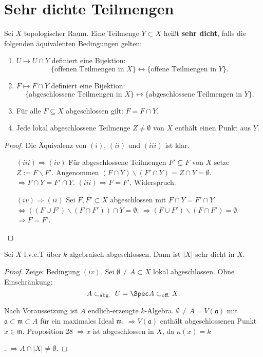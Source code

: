 \section{Sehr dichte Teilmengen}
\begin{defn}[29]
  Sei $X$ topologischer Raum. Eine Teilmenge $Y\subset X$ heißt \textbf{sehr
    dicht}, falls die folgenden äquivalenten Bedingungen gelten:
  \begin{enumerate}
  \item $U\mapsto U\cap Y$ definiert eine Bijektion:
    \[
      \{\text{offenen Teilmengen in }X\}\leftrightarrow\{\text{offene Teilmengen in }Y\}.
    \]
  \item $F\mapsto F\cap Y$ definiert eine Bijektion:
    \[
      \{\text{abgeschlossene Teilmengen in }X\}\leftrightarrow\{\text{abgeschlossene Teilmengen in }Y\}.
    \]
  \item Für alle $F\subseteq X$ abgeschlossen gilt: $F=\overline{F\cap Y}$.
  \item Jede lokal abgeschlossene Teilmenge $Z\neq\emptyset$ von $X$ enthält
    einen Punkt aus $Y$.
  \end{enumerate}
\end{defn}

\begin{proof}
  Die Äquivalenz von $(i)$, $(ii)$ und $(iii)$ ist klar.
  \begin{itemize}
  \item[$(iii)\Rightarrow(iv)$] Für abgeschlossene Teilmengen $F'\subsetneq F$ von $X$ setze $Z:=F\backslash F'$.
    Angenommen $(F\cap Y)\backslash(F'\cap Y)=Z\cap Y=\emptyset$. $\Longrightarrow F\cap Y=F'\cap Y$.
    $(iii)\Longrightarrow F=F'$, Widerspruch.
  \item[$(iv)\Rightarrow(ii)$] Sei $F,F'\subset X$ abgeschlossen mit $F\cap Y=F'\cap Y$. $\Longleftrightarrow((F\cup F')\backslash(F\cap F'))\cap Y=\emptyset$.
    $\Longrightarrow(F\cup F')\backslash(F\cap F')=\emptyset$. $\Longrightarrow F=F'$.
  \end{itemize}
\end{proof}
\begin{prop}[30]
  Sei $X$ l.v.e.T über $k$ algebraisch abgeschlossen. Dann ist $|X|$
  sehr dicht in $X$.
\end{prop}

\begin{proof}
  Zeige: Bedingung $(iv)$. Sei $\emptyset\neq A\subset X$ lokal abgeschlossen.
  Ohne Einschränkung: 
  \[
    A\subset_{\text{abg. }}U=\Spec A\subset_{\text{off.}}X.
  \]

  Nach Voraussetzung ist $A$ endlich-erzeugte $k$-Algebra. $\emptyset\neq A=V(\mathfrak{a})$
  mit $\mathfrak{a}\subset\mathfrak{m}\subset A$ für ein maximales
  Ideal $\mathfrak{m}$. $\Longrightarrow V(\mathfrak{a})$ enthält
  abgeschlossenen Punkt $x\in\mathfrak{m}$. Proposition 28 $\Longrightarrow x$
  ist abgeschlossen in $X$, da $\kappa(x)=k$%
  \begin{comment}
    unlesbar
  \end{comment}
  . $\Longrightarrow A\cap|X|\neq\emptyset$.
\end{proof}
